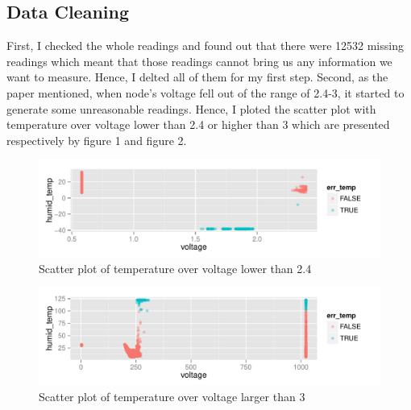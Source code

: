 \documentclass{article}\usepackage[]{graphicx}\usepackage[]{color}
\makeatletter
\def\maxwidth{ %
  \ifdim\Gin@nat@width>\linewidth
    \linewidth
  \else
    \Gin@nat@width
  \fi
}
\newenvironment{knitrout}{}{} %
\makeatother
\begin{document}
\subsection{Data Cleaning}
First, I checked the whole readings and found out that there were 12532 missing readings which meant that those readings cannot bring us any information we want to measure. Hence, I delted all of them for my first step. Second, as the paper mentioned, when node's voltage fell out of the range of 2.4-3, it started to generate some unreasonable readings. Hence, I ploted the scatter plot with temperature over voltage lower than 2.4 or higher than 3 which are presented respectively by figure 1 and figure 2.
\begin{knitrout}
\color{fgcolor}\begin{figure}[h!]

{\centering \includegraphics[width=\maxwidth]{figure/addfigure1-1} 

}

\caption[Scatter plot of temperature over voltage lower than 2]{Scatter plot of temperature over voltage lower than 2.4}\label{fig:addfigure1}
\end{figure}


\end{knitrout}
\begin{knitrout}
\color{fgcolor}\begin{figure}[h!]

{\centering \includegraphics[width=\maxwidth]{figure/addfigure2-1} 

}

\caption[Scatter plot of temperature over voltage larger than 3]{Scatter plot of temperature over voltage larger than 3}\label{fig:addfigure2}
\end{figure}


\end{knitrout}
\end{document}
